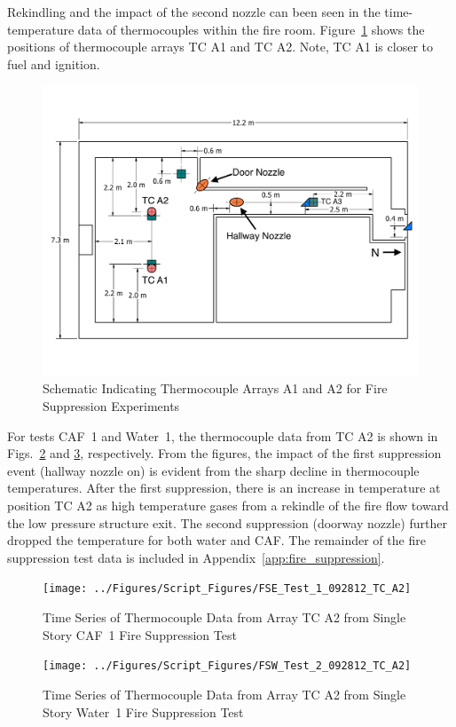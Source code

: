 \documentclass[12pt,oneside]{book}
\begin{document}
Rekindling and the impact of the second nozzle can been seen in the time-temperature data of thermocouples within the fire room. Figure~\ref{fig:fs_instruments} shows the positions of thermocouple arrays TC A1 and TC A2. Note, TC A1 is closer to fuel and ignition.

\begin{figure}[!ht]
	\includegraphics[width=.85\columnwidth]{../Figures/Floor_Plans/PDFs/East_Structure/DelCo_2012_East_Structure_Instrumentation2}
	\caption{Schematic Indicating Thermocouple Arrays A1 and A2 for Fire Suppression Experiments}
	\label{fig:fs_instruments}
\end{figure}

For tests CAF~1 and Water~1, the thermocouple data from TC A2 is shown in Figs.~\ref{fig:caf1_tca2} and \ref{fig:water1_tca2}, respectively. From the figures, the impact of the first suppression event (hallway nozzle on) is evident from the sharp decline in thermocouple temperatures. After the first suppression, there is an increase in temperature at position TC A2 as high temperature gases from a rekindle of the fire flow toward the low pressure structure exit. The second suppression (doorway nozzle) further dropped the temperature for both water and CAF. The remainder of the fire suppression test data is included in Appendix~\ref{app:fire_suppression}.

\begin{figure}[!ht]
	\texttt{[image: ../Figures/Script\_Figures/FSE\_Test\_1\_092812\_TC\_A2]}
	\caption{Time Series of Thermocouple Data from Array TC A2 from Single Story CAF~1 Fire Suppression Test}
	\label{fig:caf1_tca2}
\end{figure}

\begin{figure}[!ht]
	\texttt{[image: ../Figures/Script\_Figures/FSW\_Test\_2\_092812\_TC\_A2]}
	\caption{Time Series of Thermocouple Data from Array TC A2 from Single Story Water~1 Fire Suppression Test}
	\label{fig:water1_tca2}
\end{figure}
\end{document}
